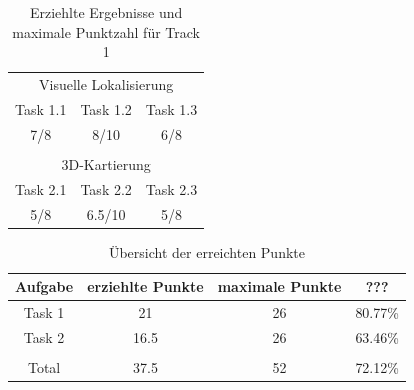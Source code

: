 \documentclass[12pt,titlepage, a4paper]{article}
\begin{document}
\begin{table}
\centering
\begin{tabular}{c|c|c}
\multicolumn{3}{c}{Visuelle Lokalisierung}\vspace{2mm}\\
Task 1.1 & Task 1.2 & Task 1.3\\
\hline\vspace{2mm}
7/8 & 8/10 & 6/8\\
\multicolumn{3}{c}{ }\\
\multicolumn{3}{c}{3D-Kartierung}\vspace{2mm}\\
Task 2.1 & Task 2.2 & Task 2.3\\
\hline\vspace{2mm}
5/8 & 6.5/10 & 5/8\\
\end{tabular}
\caption{Erziehlte Ergebnisse und maximale Punktzahl für Track 1}
\label{table:finalscore1}
\end{table}


\begin{table}
\centering
\begin{tabular}{c|c|c|c}
Aufgabe & erziehlte Punkte & maximale Punkte & ???\\
\hline
Task 1 & 21 & 26 & 80.77\% \\
Task 2 & 16.5 & 26 & 63.46\% \\
\hline
\hline
 & & \\
Total & 37.5 & 52 & 72.12\%\\
\end{tabular}
\caption{Übersicht der erreichten Punkte}
\label{table:finalscore2}
\end{table}

\FloatBarrier



\end{document}
